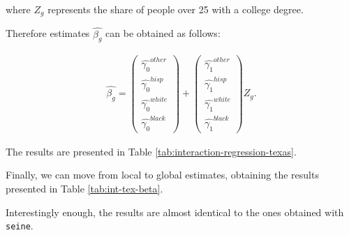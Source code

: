 where $Z_g$ represents the share of people over 25 with a college degree.

Therefore estimates $\hat{\beta_g}$ can be obtained as follows:

\begin{align*}
    \hat{\beta_g}=\begin{pmatrix}
        \hat{\gamma_0}^{other}\\
        \hat{\gamma_0}^{hisp}\\
        \hat{\gamma_0}^{white}\\
        \hat{\gamma_0}^{black}
        \end{pmatrix} +
        \begin{pmatrix}
        \hat{\gamma_1}^{other}\\
        \hat{\gamma_1}^{hisp}\\
        \hat{\gamma_1}^{white}\\
        \hat{\gamma_1}^{black}
    \end{pmatrix} Z_g.
\end{align*}

The results are presented in Table \ref{tab:interaction-regression-texas}.



Finally, we can move from local to global estimates, obtaining the results presented in Table \ref{tab:int-tex-beta}.




Interestingly enough, the results are almost identical to the ones obtained with \texttt{seine}.


\newpage